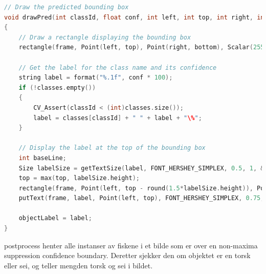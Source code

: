 \begin{lstlisting}[language=C++, caption=main.cpp]
// Draw the predicted bounding box
void drawPred(int classId, float conf, int left, int top, int right, int bottom, Mat& frame)
{
    // Draw a rectangle displaying the bounding box
    rectangle(frame, Point(left, top), Point(right, bottom), Scalar(255, 178, 50), 3);

    // Get the label for the class name and its confidence
    string label = format("%.1f", conf * 100);
    if (!classes.empty())
    {
        CV_Assert(classId < (int)classes.size());
        label = classes[classId] + " " + label + "\%";
    }

    // Display the label at the top of the bounding box
    int baseLine;
    Size labelSize = getTextSize(label, FONT_HERSHEY_SIMPLEX, 0.5, 1, &baseLine);
    top = max(top, labelSize.height);
    rectangle(frame, Point(left, top - round(1.5*labelSize.height)), Point(left + round(1.5*labelSize.width), top + baseLine), Scalar(255, 255, 255), FILLED);
    putText(frame, label, Point(left, top), FONT_HERSHEY_SIMPLEX, 0.75, Scalar(0,0,0),1);

    objectLabel = label;
}
\end{lstlisting}

postprocess henter alle instanser av fiskene i et bilde som er over en non-maxima suppression confidence boundary. Deretter sjekker den om objektet er en torsk eller sei, og teller mengden torsk og sei i bildet.

